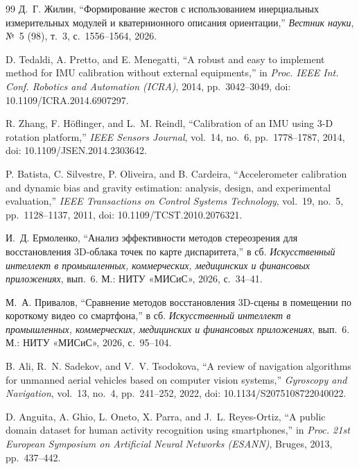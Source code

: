 \documentclass{misisarticle}
\begin{document}
\begin{thebibliography}{99}
 Д.~Г. Жилин, ``Формирование жестов с использованием инерциальных измерительных модулей и кватернионного описания ориентации,'' \textit{Вестник науки}, №~5 (98), т.~3, с.~1556--1564, 2026.

 D. Tedaldi, A. Pretto, and E. Menegatti, ``A robust and easy to implement method for IMU calibration without external equipments,'' in \textit{Proc. IEEE Int. Conf. Robotics and Automation (ICRA)}, 2014, pp.~3042--3049, doi: 10.1109/ICRA.2014.6907297.

 R. Zhang, F. Höflinger, and L.~M. Reindl, ``Calibration of an IMU using 3-D rotation platform,'' \textit{IEEE Sensors Journal}, vol.~14, no.~6, pp.~1778--1787, 2014, doi: 10.1109/JSEN.2014.2303642.

 P. Batista, C. Silvestre, P. Oliveira, and B. Cardeira, ``Accelerometer calibration and dynamic bias and gravity estimation: analysis, design, and experimental evaluation,'' \textit{IEEE Transactions on Control Systems Technology}, vol.~19, no.~5, pp.~1128--1137, 2011, doi: 10.1109/TCST.2010.2076321.

 И.~Д. Ермоленко, ``Анализ эффективности методов стереозрения для восстановления 3D-облака точек по карте диспаритета,'' в сб. \textit{Искусственный интеллект в промышленных, коммерческих, медицинских и финансовых приложениях}, вып.~6. М.: НИТУ «МИСиС», 2026, с.~34--41.

 М.~А. Привалов, ``Сравнение методов восстановления 3D-сцены в помещении по короткому видео со смартфона,'' в сб. \textit{Искусственный интеллект в промышленных, коммерческих, медицинских и финансовых приложениях}, вып.~6. М.: НИТУ «МИСиС», 2026, с.~95--104.

 B. Ali, R.~N. Sadekov, and V.~V. Tsodokova, ``A review of navigation algorithms for unmanned aerial vehicles based on computer vision systems,'' \textit{Gyroscopy and Navigation}, vol.~13, no.~4, pp.~241--252, 2022, doi: 10.1134/S2075108722040022.

 D. Anguita, A. Ghio, L. Oneto, X. Parra, and J.~L. Reyes-Ortiz, ``A public domain dataset for human activity recognition using smartphones,'' in \textit{Proc. 21st European Symposium on Artificial Neural Networks (ESANN)}, Bruges, 2013, pp.~437--442.

\end{thebibliography}
\end{document}
